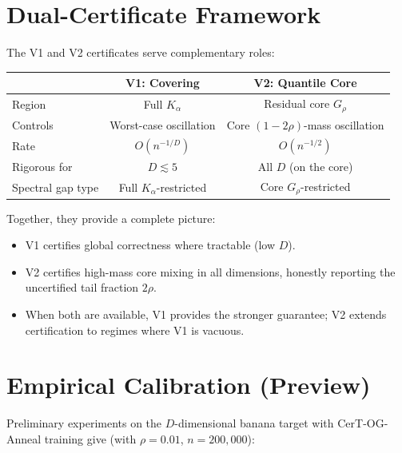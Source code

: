 \documentclass[11pt]{article}
\begin{document}
\section{Dual-Certificate Framework}

The V1 and V2 certificates serve complementary roles:

\medskip
\begin{center}
\begin{tabular}{lcc}
\hline
& \textbf{V1: Covering} & \textbf{V2: Quantile Core} \\
\hline
Region & Full $K_\alpha$ & Residual core $G_\rho$ \\
Controls & Worst-case oscillation & Core $(1-2\rho)$-mass oscillation \\
Rate & $O(n^{-1/D})$ & $O(n^{-1/2})$ \\
Rigorous for & $D \lesssim 5$ & All $D$ (on the core) \\
Spectral gap type & Full $K_\alpha$-restricted & Core $G_\rho$-restricted \\
\hline
\end{tabular}
\end{center}

\medskip
\noindent Together, they provide a complete picture:
\begin{itemize}[nosep]
  \item V1 certifies global correctness where tractable (low $D$).
  \item V2 certifies high-mass core mixing in all dimensions, honestly reporting the uncertified tail fraction $2\rho$.
  \item When both are available, V1 provides the stronger guarantee; V2 extends certification to regimes where V1 is vacuous.
\end{itemize}


\section{Empirical Calibration (Preview)}

Preliminary experiments on the $D$-dimensional banana target with CerT-OG-Anneal training give (with $\rho = 0.01$, $n = 200{,}000$):
\end{document}
